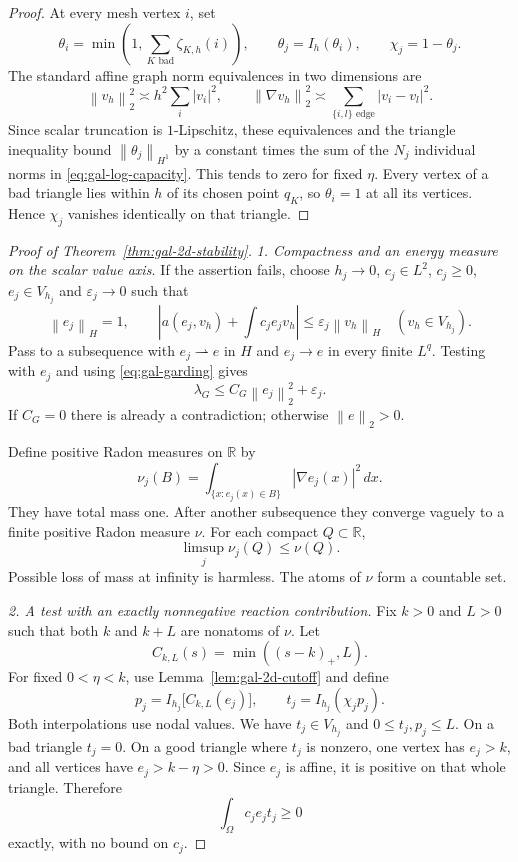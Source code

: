 \documentclass[11pt,a4paper]{article}
\newcommand{\R}{\mathbb R}
\newcommand{\norm}[1]{\left\lVert#1\right\rVert}
\newcommand{\abs}[1]{\left\lvert#1\right\rvert}
\theoremstyle{definition}
\theoremstyle{remark}
\numberwithin{equation}{section}
\begin{document}
\begin{proof}
At every mesh vertex $i$, set
\[
 \theta_i=\min\!\left(1,\sum_{K\text{ bad}}\zeta_{K,h}(i)\right),
 \qquad \theta_j=I_h(\theta_i),\qquad \chi_j=1-\theta_j.
\]
The standard affine graph norm equivalences in two dimensions are
\[
 \norm{v_h}_2^2\asymp h^2\sum_i\abs{v_i}^2,
 \qquad
 \norm{\nabla v_h}_2^2\asymp\sum_{\{i,l\}\text{ edge}}\abs{v_i-v_l}^2.
\]
Since scalar truncation is $1$-Lipschitz, these equivalences and the triangle inequality bound $\norm{\theta_j}_{H^1}$ by a constant times the sum of the $N_j$ individual norms in \eqref{eq:gal-log-capacity}. This tends to zero for fixed $\eta$. Every vertex of a bad triangle lies within $h$ of its chosen point $q_K$, so $\theta_i=1$ at all its vertices. Hence $\chi_j$ vanishes identically on that triangle.
\end{proof}

\begin{proof}[Proof of Theorem~\ref{thm:gal-2d-stability}]
\emph{1. Compactness and an energy measure on the scalar value axis.}
If the assertion fails, choose $h_j\to0$, $c_j\in L^2$, $c_j\ge0$, $e_j\in V_{h_j}$ and $\varepsilon_j\to0$ such that
\begin{equation}\label{eq:gal-small-residual}
 \norm{e_j}_H=1,
 \qquad
 \abs{a(e_j,v_h)+\int c_j e_jv_h}\le\varepsilon_j\norm{v_h}_H
 \quad(v_h\in V_{h_j}).
\end{equation}
Pass to a subsequence with $e_j\rightharpoonup e$ in $H$ and $e_j\to e$ in every finite $L^q$. Testing with $e_j$ and using \eqref{eq:gal-garding} gives
\begin{equation}\label{eq:gal-nonzero-limit}
 \lambda_G\le C_G\norm{e_j}_2^2+\varepsilon_j.
\end{equation}
If $C_G=0$ there is already a contradiction; otherwise $\norm{e}_2>0$.

Define positive Radon measures on $\R$ by
\[
 \nu_j(B)=\int_{\{x:e_j(x)\in B\}}\abs{\nabla e_j(x)}^2\,dx.
\]
They have total mass one. After another subsequence they converge vaguely to a finite positive Radon measure $\nu$. For each compact $Q\subset\R$,
\begin{equation}\label{eq:gal-vague-upper}
 \limsup_j\nu_j(Q)\le\nu(Q).
\end{equation}
Possible loss of mass at infinity is harmless. The atoms of $\nu$ form a countable set.

\emph{2. A test with an exactly nonnegative reaction contribution.}
Fix $k>0$ and $L>0$ such that both $k$ and $k+L$ are nonatoms of $\nu$. Let
\[
 C_{k,L}(s)=\min((s-k)_+,L).
\]
For fixed $0<\eta<k$, use Lemma~\ref{lem:gal-2d-cutoff} and define
\[
 p_j=I_{h_j}\bigl[C_{k,L}(e_j)\bigr],\qquad
 t_j=I_{h_j}(\chi_jp_j).
\]
Both interpolations use nodal values. We have $t_j\in V_{h_j}$ and $0\le t_j,p_j\le L$. On a bad triangle $t_j=0$. On a good triangle where $t_j$ is nonzero, one vertex has $e_j>k$, and all vertices have $e_j>k-\eta>0$. Since $e_j$ is affine, it is positive on that whole triangle. Therefore
\begin{equation}\label{eq:gal-reaction-sign}
 \int_\Omega c_j e_jt_j\ge0
\end{equation}
exactly, with no bound on $c_j$.


\end{proof}
\end{document}
